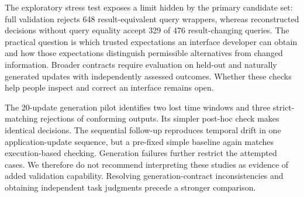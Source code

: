 \documentclass[manuscript,review,anonymous]{acmart}
\begin{document}
The exploratory stress test exposes a limit hidden by the primary candidate set: full validation rejects 648 result-equivalent query wrappers, whereas reconstructed decisions without query equality accept 329 of 476 result-changing queries. The practical question is which trusted expectations an interface developer can obtain and how those expectations distinguish permissible alternatives from changed information. Broader contracts require evaluation on held-out and naturally generated updates with independently assessed outcomes. Whether these checks help people inspect and correct an interface remains open.

The 20-update generation pilot identifies two lost time windows and three strict-matching rejections of conforming outputs. Its simpler post-hoc check makes identical decisions. The sequential follow-up reproduces temporal drift in one application-update sequence, but a pre-fixed simple baseline again matches execution-based checking. Generation failures further restrict the attempted cases. We therefore do not recommend interpreting these studies as evidence of added validation capability. Resolving generation-contract inconsistencies and obtaining independent task judgments precede a stronger comparison.



\end{document}
